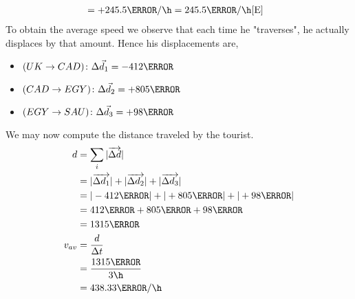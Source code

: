 \documentclass[12pt]{article} %
\newcommand{\tx}[1]{\text{#1}}
\begin{document}
\begin{qstn}[3]
\begin{soln}
\begin{align*}
            &= +245.5 \km / \h = 245.5 \km/\h [\tx{E}]
        \end{align*}
        To obtain the average speed we observe that each time he "traverses", he actually displaces by that amount. Hence his displacements are,
        \begin{itemize}
            \item $(UK \rightarrow CAD) \colon \Delta \vec d_1 = -412\km$
            \item $(CAD \rightarrow EGY) \colon \Delta \vec d_2 = +805\km$
            \item $(EGY \rightarrow SAU) \colon \Delta \vec d_3 = +98\km$
        \end{itemize}
        We may now compute the distance traveled by the tourist.
        \begin{align*}
            d &= \sum_i |\overrightarrow{\Delta d}|\\
            &= |\overrightarrow{\Delta d_1}| + |\overrightarrow{\Delta d_2}| +|\overrightarrow{\Delta d_3}|\\
            &= |-412\km| + |+805\km| + |+98\km|\\
            &= 412\km + 805\km + 98\km\\
            &= 1315 \km\\
            v_{av} &= \frac{d}{\Delta t}\\
            &= \frac{1315\km}{3 \h}\\
            &= 438.33 \km/ \h
        \end{align*}

    \end{soln}

\end{qstn}
\end{document}
